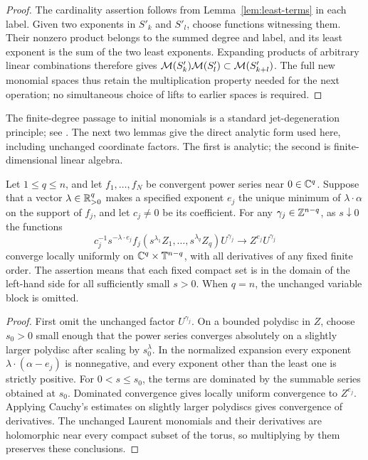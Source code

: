 \begin{proof}
The cardinality assertion follows from Lemma~\ref{lem:least-terms} in each
label. Given two exponents in $S'_k$ and $S'_l$, choose functions witnessing
them. Their nonzero product belongs to the summed degree and label, and
its least exponent is the sum of the two least exponents.
Expanding products of arbitrary linear combinations therefore gives
$\mathcal M(S'_k)\mathcal M(S'_l)\subset\mathcal M(S'_{k+l})$. The full new monomial spaces
thus retain the multiplication property needed for the next operation;
no simultaneous choice of lifts to earlier spaces is required.
\end{proof}

The finite-degree passage to initial monomials is a standard
jet-degeneration principle; see \citet[Proposition~5.7]{Ito2013}. The next
two lemmas give the direct analytic form used here, including unchanged
coordinate factors. The first is analytic; the second is finite-dimensional
linear algebra.

\begin{lemma}
\label{lem:weighted-limit}
Let $1\leq q\leq n$, and let $f_1,\ldots,f_N$ be convergent power series
near $0\in\mathbb C^q$. Suppose
that a vector $\lambda\in\mathbb R_{>0}^q$ makes a specified exponent $e_j$ the
unique minimum of $\lambda\cdot\alpha$ on the support of $f_j$, and let
$c_j\ne0$ be its coefficient. For any
$\gamma_j\in\mathbb Z^{n-q}$, as $s\downarrow0$ the functions
\begin{equation}\label{eq:weighted-limit}
 c_j^{-1}s^{-\lambda\cdot e_j}
 f_j(s^{\lambda_1}Z_1,\ldots,s^{\lambda_q}Z_q)U^{\gamma_j}
 \longrightarrow Z^{e_j}U^{\gamma_j}
\end{equation}
converge locally uniformly on $\mathbb C^q\times\mathbb T^{n-q}$, with all derivatives
of any fixed finite order. The assertion means that each fixed compact set
is in the domain of the left-hand side for all sufficiently small $s>0$.
When $q=n$, the unchanged variable block is omitted.
\end{lemma}

\begin{proof}
First omit the unchanged factor $U^{\gamma_j}$. On a bounded polydisc in
$Z$, choose $s_0>0$ small enough that the power series converges absolutely
on a slightly larger polydisc after scaling by $s_0^\lambda$. In the
normalized expansion every exponent $\lambda\cdot(\alpha-e_j)$ is
nonnegative, and every exponent other than the least one is strictly
positive. For $0<s\leq s_0$, the terms are
dominated by the summable series obtained at $s_0$. Dominated convergence
gives locally uniform convergence to $Z^{e_j}$. Applying Cauchy's estimates
on slightly larger polydiscs gives convergence of derivatives. The unchanged
Laurent monomials and their derivatives are holomorphic near every compact
subset of the torus, so multiplying by them preserves these conclusions.
\end{proof}

